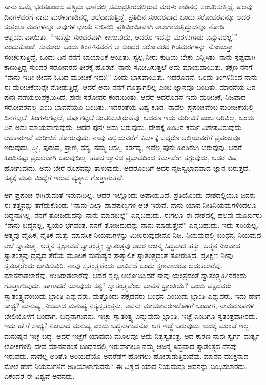 \vskip 0.2cm

ನಾನು ಒಮ್ಮೆ ಭರತಖಂಡದ ಪಶ್ಚಿಮ ಭಾಗದಲ್ಲಿ ಸಮುದ್ರತೀರದಲ್ಲಿರುವ ಮರಳು ಕಾಡಿನಲ್ಲಿ ಸಂಚರಿಸುತ್ತಿದ್ದೆ. ಹಲವು ದಿನಗಳವರೆಗೆ ನಾನು ಮರಳುಗಾಡಿನಲ್ಲಿ ಅಲೆದಾಡುತ್ತಿದ್ದೆ. ಪ್ರತಿದಿನ ಸುಂದರವಾದ ಒಂದು ಸರೋವರವನ್ನೂ ಅದರ ಸುತ್ತಲೂ ಮರಗಳನ್ನೂ ಅವುಗಳ ಛಾಯೆ ನೀರಿನಲ್ಲಿ ಪ್ರತಿಬಿಂಬಿತವಾಗಿ ಅಲುಗಾಡುತ್ತಿದ್ದುದನ್ನೂ ನೋಡಿ ಆಶ್ಚರ್ಯವಾಯಿತು. “ಇದೆಷ್ಟು ಸುಂದರವಾಗಿ ಕಾಣುವುದು, ಆದರೂ ಇದನ್ನು ಮರಳುಗಾಡು ಎನ್ನುವರಲ್ಲ!” ಎಂದುಕೊಂಡೆ. ಸುಮಾರು ಒಂದು ತಿಂಗಳಿನವರೆಗೆ ಆ ಸುಂದರ ಸರೋವರದ ಗಿಡಮರಗಳನ್ನು ನೋಡುತ್ತಾ ಸಂಚರಿಸುತ್ತಿದ್ದೆ. ಒಂದು ದಿನ ನನಗೆ ಬಾಯಾರಿಕೆ ಆಯಿತು. ಸ್ವಲ್ಪ ನೀರು ಕುಡಿಯ ಬೇಕು ಎನ್ನಿಸಿತು. ನಾನು ಸ್ಪಷ್ಟವಾಗಿ ಕಾಣುತ್ತಿದ್ದ ಸುಂದರ ಸರೋವರದ ತೀರಕ್ಕೆ ಹೊರಟೆ. ನಾನು ಸಮೀಪಿಸುತ್ತಲೆ ಅದು ಮಾಯವಾಯಿತು. ತಕ್ಷಣ ನನಗೆ “ನಾನು ಇಡೀ ಜೀವನ ಓದಿದ ಮರೀಚಿಕೆ ಇದು!” ಎಂದು ಭಾಸವಾಯಿತು. ಇದರೊಡನೆ, ಒಂದು ತಿಂಗಳಿನಿಂದ ನಾನು ಈ ಮರೀಚಿಕೆಯನ್ನೇ ನೋಡುತ್ತಿದ್ದೆ, ಆದರೆ ಅದು ನನಗೆ ಗೊತ್ತಾಗಲಿಲ್ಲ ಎಂಬ ಜ್ಞಾನವೂ ಬಂದಿತು. ಮಾರನೆಯ ದಿನ ಪುನಃ ನಡೆಯಲುಪಕ್ರಮಿಸಿದೆ. ಪುನಃ ಸರೋವರ ಕಂಡುಬಂತು. ಆದರೆ ಅದರೊಡನೆ ಇದು ಮರೀಚಿಕೆ, ನಿಜವಾದ ಸರೋವರವಲ್ಲ ಎಂಬ ಭಾವನೆಯೂ ಬಂದಿತು. ಇದರಂತೆಯೆ ವಿಶ್ವ ಕೂಡ. ನಾವೆಲ್ಲ ಪ್ರಪಂಚವೆಂಬ ಮರೀಚಿಕೆಯಲ್ಲಿ ದಿನಗಟ್ಟಲೆ, ತಿಂಗಳುಗಟ್ಟಲೆ, ವರ್ಷಗಟ್ಟಲೆ ಸಂಚರಿಸುತ್ತಿರುವೆವು. ಆದರೂ ಇದು ಮರೀಚಿಕೆ ಎಂಬ ಅರಿವಿಲ್ಲ. ಒಂದು ದಿನ ಅದು ಮಾಯವಾಗುವುದು. ಆದರೆ ಪುನಃ ಅದು ಬರುವುದು. ದೇಹಕ್ಕೆ ಹಿಂದಿನ ಕರ್ಮ ವಿಶೇಷವಿರುವುದು. ಆದಕಾರಣವೆ ಮರೀಚಿಕೆ ತೋರುವುದು. ನಾವು ಎಲ್ಲಿಯವರೆಗೆ ಕರ್ಮಕ್ಕೆ ಬದ್ದರೊ ಅಲ್ಲಿಯವರೆಗೆ ಪ್ರಪಂಚವೂ ಇರುವುದು. ಸ್ತ್ರೀ, ಪುರುಷ, ಪ್ರಾಣಿ, ಸಸ್ಯ, ನಮ್ಮ ಆಸಕ್ತಿ, ಕರ್ತವ್ಯ, ಇವೆಲ್ಲ ಪುನಃ ಹಿಂತಿರುಗಿ ಬರುವುವು. ಆದರೆ ಹಿಂದಿನಷ್ಟು ಪ್ರಬಲವಾಗಿ ಬರುವುದಿಲ್ಲ. ಹೊಸ ಜ್ಞಾನದ ಪ್ರಭಾವದಿಂದ ಕರ್ಮವೇಗ ತಗ್ಗುವುದು, ಅದರ ವಿಷ ಹೋಗುವುದು. ಅದು ಬೇರೆ ರೂಪವನ್ನು ತಾಳುವುದು. ಅದರೊಂದಿಗೆ ಅದರ ನೈಜಸ್ವಭಾವವಾದ ಜ್ಞಾನ ಬರುತ್ತದೆ. ಸತ್ಯಕ್ಕೆ ಮತ್ತು ಮಿಥ್ಯೆಗೆ ಇರುವ ವ್ಯತ್ಯಾಸ ಗೊತ್ತಾಗುತ್ತದೆ.

\vskip 0.2cm

ಆಗ ಪ್ರಪಂಚ ಈಗಿರುವಂತೆ ಇರುವುದಿಲ್ಲ. ಆದರೆ ಇಲ್ಲೊಂದು ಅಪಾಯವಿದೆ. ಪ್ರತಿಯೊಂದು ದೇಶದಲ್ಲಿಯೂ ಜನರು ಈ ತತ್ತ್ವವನ್ನು ತೆಗೆದುಕೊಂಡು “ನಾನು ಎಲ್ಲಾ ಪಾಪಪುಣ್ಯಗಳ ಆಚೆ ಇರುವೆ. ನಾನು ಯಾವ ನೀತಿನಿಯಮಗಳಿಂದಲೂ ಬದ್ಧನಾಗಿಲ್ಲ. ನನಗೆ ತೋಚಿದುದನ್ನು ನಾನು ಮಾಡಬಲ್ಲೆ” ಎನ್ನಬಹುದು. ಈಗಲೂ ಈ ದೇಶದಲ್ಲಿ ಹಲವು ಮೂರ್ಖರು “ನಾನು ಬದ್ಧನಲ್ಲ, ಸ್ವಯಂ ಭಗವಂತ. ನನಗೆ ತೋಚಿದುದನ್ನು ನಾನು ಮಾಡುತ್ತೇನೆ” ಎನ್ನಬಹುದು. ಇದು ಸರಿಯಲ್ಲ. ಆತ್ಮವು ದೈಹಿಕ, ನೈತಿಕ ಮತ್ತು ಮಾನಸಿಕ ನಿಯಮಗಳನ್ನು ಮೀರಿರುವುದೇನೊ ನಿಜ. ನಿಯಮದಲ್ಲಿ ಬಂಧನ, ನಿಯಮದ ಆಚೆ ಸ್ವಾತಂತ್ರ್ಯ. ಆತ್ಮನ ಸ್ವಭಾವವೆ ಸ್ವಾತಂತ್ರ್ಯ; ಸ್ವಾತಂತ್ರ್ಯವು ಅದರ ಆಜನ್ಮ ಸಿದ್ಧವಾದ ಹಕ್ಕು. ಆತ್ಮನ ನಿಜವಾದ ಸ್ವಾತಂತ್ರ್ಯವು ದ್ರವ್ಯದ ತೆರೆಯ ಮೂಲಕ ಮನುಷ್ಯನ ತಾತ್ಕಾಲಿಕ ಸ್ವಾತಂತ್ರ್ಯದಂತೆ ತೋರುತ್ತಿದೆ. ಪ್ರತಿಕ್ಷಣ ನೀವು ಸ್ವತಂತ್ರರೆಂದು ಭಾವಿಸುವಿರಿ. ನಾವು ಸ್ವತಂತ್ರ್ಯರೆಂದು ಭಾವಿಸದೆ ಒಂದು ಕ್ಷಣವಾದರೂ ಬದುಕಲಾರೆವು. ಮಾತನಾಡಲಾರೆವು. ಉಸಿರಾಡಲಾರೆವು. ಆದರೆ ಸ್ವಲ್ಪ ಆಲೋಚಿಸಿದರೆ ನಾವು ಯಂತ್ರದಂತೆ ಸ್ವಾತಂತ್ರ್ಯಹೀನರೆಂದು ಗೊತ್ತಾಗುವುದು. ಹಾಗಾದರೆ ಯಾವುದು ಸತ್ಯ? ಸ್ವಾತಂತ್ರ್ಯವೆಂಬ ಭಾವನೆ ಭ್ರಾಂತಿಯೆ? ಒಂದು ಪಕ್ಷದವರು ಸ್ವಾತಂತ್ರ್ಯವೆಂಬುದು ಭ್ರಾಂತಿ ಎನ್ನುವರು. ಮತ್ತೊಂದು ಪಕ್ಷದವರು ಬಂಧನ ಎಂಬುದು ಭ್ರಾಂತಿ ಎನ್ನುವರು. ಇದು ಹೇಗೆ ಸಾಧ್ಯ? ಮನುಷ್ಯ, ನಿಜವಾದ ಮನುಷ್ಯ ನಿತ್ಯಸ್ವತಂತ್ರನು, ಅವನು ಮಾಯಾವರಣದೊಳಗೆ ಬಂದಾಗ, ನಾಮರೂಪಗಳ ಬೇಲಿಯೊಳಗೆ ಬಂದಾಗ, ಬದ್ಧನಾಗುವನು. ಇಚ್ಛಾ ಸ್ವಾತಂತ್ರ್ಯ ಎನ್ನುವುದು ಭ್ರಾಂತಿ. ಇಚ್ಛೆ ಎಂದಿಗೂ ಸ್ವತಂತ್ರವಾಗಿರದು. ಇದು ಹೇಗೆ ಸಾಧ್ಯ? ನಿಜವಾದ ಮನುಷ್ಯ ಎಂದು ಬದ್ಧನಾಗುವನೋ ಆಗ ಇಚ್ಛೆ ಬರುವುದು. ಅದಕ್ಕೆ ಮುಂಚೆ ಇಲ್ಲ. ಮನುಷ್ಯನ ಇಚ್ಛೆ ಬದ್ಧ. ಆದರೆ ಇಚ್ಛೆಗೆ ಯಾವುದು ಮೂಲವೊ ಅದು ನಿತ್ಯಸ್ವತಂತ್ರ. ಆದ ಕಾರಣ ನಾವು ಸ್ವರ್ಗ–ಮರ್ತ್ಯ ಲೋಕಗಳಲ್ಲಿ ದೇವ ಮಾನವರಂತೆ ಬಂಧನದಲ್ಲಿ ಇರುವಾಗಲೂ ನಮ್ಮ ಆಜನ್ಮ ಸಿದ್ಧವಾದ ಸ್ವಾತಂತ್ರ್ಯದ ನೆನಪು ಇರುವದು. ನಾವೆಲ್ಲ ಅರಿತೊ ಅರಿಯದೆಯೊ ಅದರೆಡೆಗೆ ಹೋಗಲು ಹೋರಾಡುತ್ತಿರುವೆವು. ಮಾನವ ಮುಕ್ತನಾದ ಮೇಲೆ ಹೇಗೆ ನಿಯಮಗಳಿಗೆ ಅಡಿಯಾಳಾಗುವನು? ಈ ವಿಶ್ವದ ಯಾವ ನಿಯಮವೂ ಅವನನ್ನು ಬಂಧಿಸಬಾರದು. ಏಕೆಂದರೆ ಈ ವಿಶ್ವವೆ ಅವನದು.

